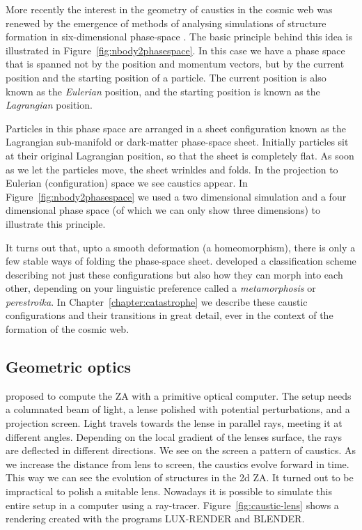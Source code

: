 More recently the interest in the geometry of caustics in the cosmic web was renewed by the emergence of methods of analysing simulations of structure formation in six-dimensional phase-space \citep{Falck2012,Shandarin2012,Abel2012}. The basic principle behind this idea is illustrated in Figure~\ref{fig:nbody2phasespace}. In this case we have a phase space that is spanned not by the position and momentum vectors, but by the current position and the starting position of a particle. The current position is also known as the \emph{Eulerian} position, and the starting position is known as the \emph{Lagrangian} position.

Particles in this phase space are arranged in a sheet configuration known as the Lagrangian sub-manifold or dark-matter phase-space sheet. Initially particles sit at their original Lagrangian position, so that the sheet is completely flat. As soon as we let the particles move, the sheet wrinkles and folds. In the projection to Eulerian (configuration) space we see caustics appear. In Figure~\ref{fig:nbody2phasespace} we used a two dimensional simulation and a four dimensional phase space (of which we can only show three dimensions) to illustrate this principle.

It turns out that, upto a smooth deformation (a homeomorphism), there is only a few stable ways of folding the phase-space sheet. \citet{Arnold1976} developed a classification scheme describing not just these configurations but also how they can morph into each other, depending on your linguistic preference called a \emph{metamorphosis} or \emph{perestroika}. In Chapter~\ref{chapter:catastrophe} we describe these caustic configurations and their transitions in great detail, ever in the context of the formation of the cosmic web.

\subsection{Geometric optics}
\citet{Shandarin1989} proposed to compute the \ac{ZA} with a primitive optical computer. The setup needs a columnated beam of light, a lense polished with potential perturbations, and a projection screen. Light travels towards the lense in parallel rays, meeting it at different angles. Depending on the local gradient of the lenses surface, the rays are deflected in different directions. We see on the screen a pattern of caustics. As we increase the distance from lens to screen, the caustics evolve forward in time. This way we can see the evolution of structures in the 2d \ac{ZA}. It turned out to be impractical to polish a suitable lens. Nowadays it is possible to simulate this entire setup in a computer using a ray-tracer. Figure~\ref{fig:caustic-lens} shows a rendering created with the programs {\small LUX-RENDER} and {\small BLENDER}.

